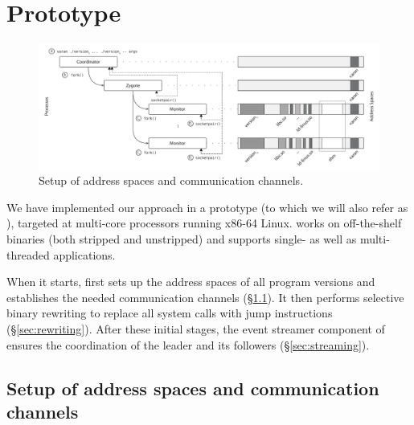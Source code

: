 \section{Prototype}
\label{sec:prototype}


\begin{figure}[t]
  \begin{center}
    \includegraphics[width=\textwidth]{efficient-execution/figures/address-space}
    \caption{Setup of address spaces and communication channels.}
    \label{fig:setup}
  \end{center}
\end{figure}


We have implemented our approach in a prototype (to which we will also
refer as \varan), targeted at multi-core processors running x86-64 Linux.
\varan works on off-the-shelf binaries (both stripped and unstripped)
and supports single- as well as multi-threaded applications.

When it starts, \varan first sets up the address spaces of all program
versions and establishes the needed communication channels
(\S\ref{sec:setup}).  It then performs selective binary rewriting to
replace all system calls with  jump instructions
(\S\ref{sec:rewriting}).  After these initial stages, the event
streamer component of \varan ensures the coordination of the leader and
its followers (\S\ref{sec:streaming}).


\subsection{Setup of address spaces and communication channels}
\label{sec:setup}

